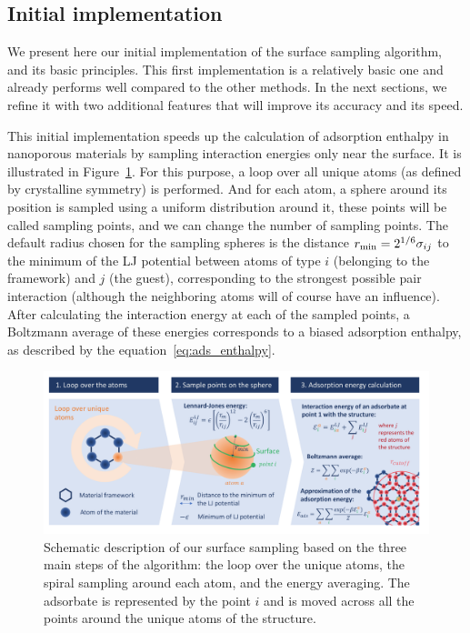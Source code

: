 \documentclass[main]{subfiles}
\begin{document}
\subsection{Initial implementation}

We present here our initial implementation of the surface sampling algorithm, and its basic principles. This first implementation is a relatively basic one and already performs well compared to the other methods. In the next sections, we refine it with two additional features that will improve its accuracy and its speed.

This initial implementation speeds up the calculation of adsorption enthalpy in nanoporous materials by sampling interaction energies only near the surface. It is illustrated in Figure~\ref{fgr:principle}. For this purpose, a loop over all unique atoms (as defined by crystalline symmetry) is performed. And for each atom, a sphere around its position is sampled using a uniform distribution around it, these points will be called sampling points, and we can change the number of sampling points. The default radius chosen for the sampling spheres is the distance $r_{\text{min}}=2^{1/6}\sigma_{ij}$ to the minimum of the LJ potential between atoms of type $i$ (belonging to the framework) and $j$ (the guest), corresponding to the strongest possible pair interaction (although the neighboring atoms will of course have an influence). After calculating the interaction energy at each of the sampled points, a Boltzmann average of these energies corresponds to a biased adsorption enthalpy, as described by the equation~\ref{eq:ads_enthalpy}.

\begin{figure}[ht]
\centering

  \includegraphics[clip, trim=0.6cm 0.74cm 0.78cm 0.6cm,width=0.95\linewidth]{figures/3-fastsim/Principe_screening.pdf}
  \caption{Schematic description of our surface sampling based on the three main steps of the algorithm: the loop over the unique atoms, the {spiral} sampling around each atom, and the energy averaging. {The adsorbate is represented by the point $i$ and is moved across all the points around the unique atoms of the structure. } }
  \label{fgr:principle}
\end{figure}
\end{document}
